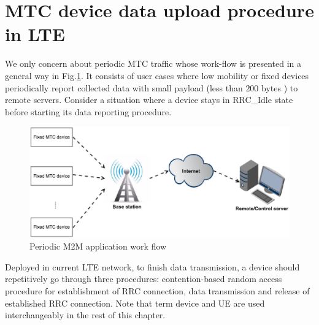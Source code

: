 \section{MTC device data upload procedure in LTE}
\label{sec:LTE-random-access}
We only concern about periodic MTC traffic whose work-flow is presented in a general way in Fig.\ref{fig:Time-driven M2M work flow}. It consists of user cases where low mobility or fixed devices periodically report collected data with small payload (less than $200$ bytes \cite{HealthInformatics}) 
to remote servers. Consider a situation where a device  stays in RRC\_Idle state before starting its data reporting procedure.
\begin{figure}[!t]
	\centering
	\includegraphics[width=\linewidth]{Chapter6/Figures/Time-driven-work-flow.eps}
	\caption{Periodic M2M application  work flow}
	\label{fig:Time-driven M2M work flow}
\end{figure}
Deployed in current LTE network, to finish data transmission, a device should repetitively go through three procedures: contention-based random access procedure for establishment of RRC connection, data transmission and release of established RRC connection. Note that term device and UE are used interchangeably in the rest of this chapter.
